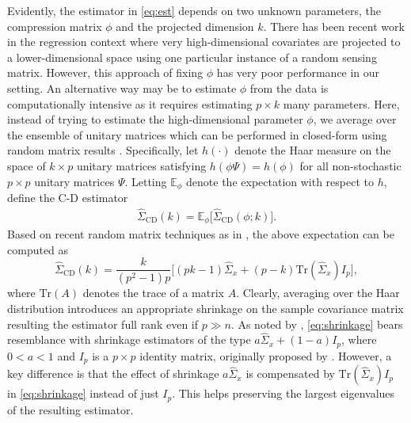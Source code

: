 \documentclass[11pt,oneside]{amsart}
\def\CD{{\mathrm{\scriptscriptstyle CD}}}
\begin{document}
Evidently, the estimator in \eqref{eq:est} depends on two unknown parameters, the compression matrix $\phi$ and the projected dimension $k$. There has been recent work in the regression context \citep{guhaniyogi2013bayesian} where very high-dimensional covariates are projected to a lower-dimensional space using one particular instance of a random sensing matrix. However, this approach of fixing $\phi$ has very poor performance in our setting. An alternative way may be to estimate $\phi$ from the data is computationally intensive as it requires estimating $p \times k$ many parameters. Here, instead of trying to estimate the high-dimensional parameter $\phi$, we average over the ensemble of unitary matrices which can be performed in closed-form using random matrix results \citep{marzetta2011random}. Specifically, let $h(\cdot)$ denote the Haar measure on the space of $k \times p$ unitary matrices satisfying $h(\phi \Psi) = h(\phi)$ for all non-stochastic $p \times p$ unitary matrices $\Psi$. Letting $\mathbb{E}_{\phi}$ denote the expectation with respect to $h$, define the C-D estimator 
\begin{align*}
\widehat{\Sigma}_{\CD}(k) = \mathbb{E}_{\phi} \big[ \widehat{\Sigma}_{\CD}(\phi; k) \big].
\end{align*}
Based on recent random matrix techniques as in \citet{marzetta2011random}, the above expectation can be computed as
\begin{equation}\label{eq:shrinkage}
\widehat{\Sigma}_{\CD}(k) = \frac{k}{(p^2 - 1)p}\bigg[(pk - 1){{\widehat{\Sigma}}_{x}} + (p - k)\mbox{Tr}({\widehat{\Sigma}}_{x})I_{p}\bigg],
\end{equation}
where $\mbox{Tr}(A)$ denotes the trace of a matrix $A$. Clearly, averaging over the Haar distribution introduces an appropriate shrinkage on the sample covariance matrix resulting the estimator full rank even if $p \gg n$. As noted by  \citet{marzetta2011random}, \eqref{eq:shrinkage} bears resemblance with shrinkage estimators of the type $a \widehat{\Sigma}_{x}
+ (1-a) I_p$, where $0 < a < 1$ and $I_p$ is a $p \times p$ identity matrix, originally proposed by \citet{ledoit2004well}.  However, a key difference is that the effect of shrinkage $a \widehat{\Sigma}_{x}$ is compensated by $\mbox{Tr}(\widehat{\Sigma}_{x})I_{p}$ in \eqref{eq:shrinkage} instead of just $I_p$. This helps preserving the largest eigenvalues of the resulting estimator. 
\end{document}
